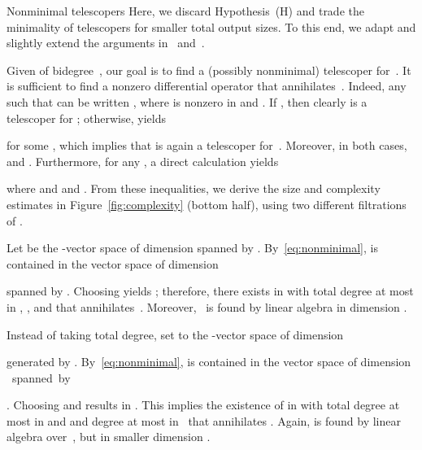 \documentclass{sig-alt-full}
\begin{document}
\begin{section}{Nonminimal telescopers}\label{sec:nonminimal-order}
Here, we discard Hypothesis~(H) and trade the minimality of telescopers for smaller total output sizes.
To this end, we adapt and slightly extend the arguments
in~\cite{Lipshitz1988} and~\cite[\S\,3]{BCLSS2007}.

\medskip
Given  of bidegree~, our goal is to
find a (possibly nonminimal) telescoper for~.
It is sufficient to
find a nonzero differential operator  that annihilates~.
Indeed, any  such that
 can be written , where  is
nonzero in  and .
If , then clearly  is a telescoper for ; otherwise,  yields

for some ,
which implies that  is again a telescoper for~. Moreover,
in both cases,  and .
Furthermore, for any , a direct calculation yields

where  and  and .  From these inequalities, we derive
the size and complexity estimates in Figure~\ref{fig:complexity} (bottom half), using
two different filtrations of .

\medskip{}
Let  be the -vector space
of dimension 
spanned by .
By~\eqref{eq:nonminimal},  is contained
in the vector space of dimension

spanned by
.
Choosing
 yields ;
therefore, there exists  in  with total degree at most
 in ,
, and  that annihilates~.
Moreover, ~is found by
linear algebra in dimension
.

\smallskip{}
Instead of taking total
degree, set  to the -vector space of dimension

generated by
.
By~\eqref{eq:nonminimal},   is contained
in the vector space of dimension
\hbox{ spanned by}


\noindent
.
Choosing  and  results in .
This implies the existence of  in  with total degree at most  in  and 
and degree at most  in~ that annihilates .
Again,  is found by linear algebra over~, but in smaller dimension
.

\end{section}
\end{document}
